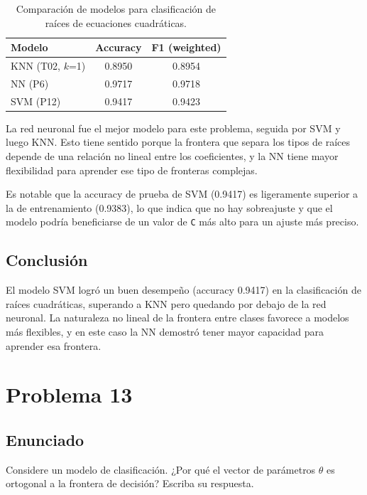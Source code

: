 \documentclass{article}
\begin{document}
\begin{table}[H]
\centering
\begin{tabular}{lcc}
\hline
\textbf{Modelo} & \textbf{Accuracy} & \textbf{F1 (weighted)} \\
\hline
KNN (T02, $k$=1)  & 0.8950 & 0.8954 \\
NN (P6)            & 0.9717 & 0.9718 \\
SVM (P12)          & 0.9417 & 0.9423 \\
\hline
\end{tabular}
\caption{Comparación de modelos para clasificación de raíces de ecuaciones cuadráticas.}
\label{tab:p12_comparacion}
\end{table}

La red neuronal fue el mejor modelo para este problema, seguida por SVM y luego KNN. Esto tiene sentido porque la frontera que separa los tipos de raíces depende de una relación no lineal entre los coeficientes, y la NN tiene mayor flexibilidad para aprender ese tipo de fronteras complejas.

Es notable que la accuracy de prueba de SVM (0.9417) es ligeramente superior a la de entrenamiento (0.9383), lo que indica que no hay sobreajuste y que el modelo podría beneficiarse de un valor de \texttt{C} más alto para un ajuste más preciso.

\subsection{Conclusión}

El modelo SVM logró un buen desempeño (accuracy 0.9417) en la clasificación de raíces cuadráticas, superando a KNN pero quedando por debajo de la red neuronal. La naturaleza no lineal de la frontera entre clases favorece a modelos más flexibles, y en este caso la NN demostró tener mayor capacidad para aprender esa frontera.

\section{Problema 13}

\subsection{Enunciado}

Considere un modelo de clasificación. ¿Por qué el vector de parámetros $\theta$ es ortogonal a la frontera de decisión? Escriba su respuesta.
\end{document}
